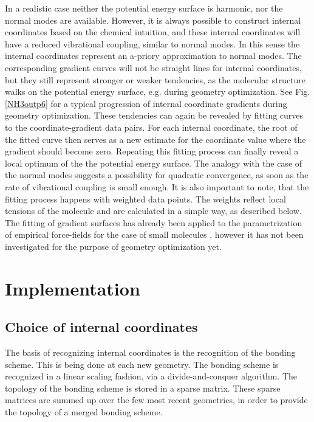 \documentclass[prl,aps,twocolumn,showpacs,twocolumngrid,superbib]{revtex4}
\begin{document}
In a realistic case neither the potential energy surface is 
harmonic, nor the normal modes are available. However, it is always
possible to construct internal coordinates based on the chemical
intuition, and these internal coordinates will have a reduced
vibrational coupling, similar to normal modes. 
In this sense the internal coordinates represent an a-priory
approximation to normal modes.
The corresponding
gradient curves will not be straight lines for internal coordinates,
but they still represent stronger or weaker tendencies, as the molecular
structure walks on the potential energy surface, e.g. during geometry
optimization. 
See Fig. \ref{NH3outp6} for a typical progression of internal
coordinate gradients during geometry optimization.
These tendencies can again be revealed by fitting curves to the
coordinate-gradient data pairs. For each internal coordinate,
the root of the fitted curve then 
serves as a new estimate for the coordinate value where the gradient
should become zero. Repeating this fitting process can finally
reveal a local optimum of the the potential energy surface.
The analogy with the case of the normal modes suggests a possibility
for quadratic convergence, as soon as the rate of vibrational
coupling is small enough.
It is also important to note, that the fitting process happens
with weighted data points. The weights reflect local tensions
of the molecule and are calculated in a simple way, as described below.
The fitting of gradient surfaces has already been applied to 
the parametrization of empirical
force-fields for the case of small molecules
\cite{force-field-fitting,force-matching}, however it 
has not been investigated for the purpose of geometry optimization yet.

\section{Implementation}
\subsection{Choice of internal coordinates}
The basis of recognizing internal coordinates is the recognition
of the bonding scheme. This is being done at each new geometry.
The bonding scheme is recognized in a linear scaling fashion, via
a divide-and-conquer algorithm. The topology of the bonding scheme
is stored in a sparse matrix. These sparse matrices are summed
up over the few most recent geometries, in order to provide
the topology of a merged bonding scheme.
\end{document}
